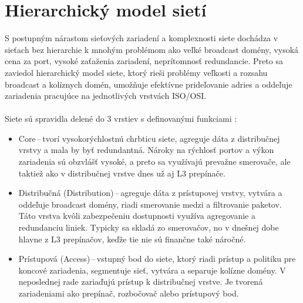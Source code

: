 \section{Hierarchický model sietí}
S postupným nárastom sieťových zariadení a komplexnosti siete dochádza v sieťach bez hierarchie k mnohým problémom ako veľké broadcast domény, vysoká cena za port, vysoké zaťaženia zariadení, neprítomnosť redundancie. Preto sa zaviedol hierarchický model siete, ktorý rieši problémy veľkosti a rozsahu broadcast a kolíznych domén, umožňuje efektívne prideľovanie  adries a oddeľuje zariadenia pracujúce na jednotlivých vrstvách ISO/OSI.  
\\\\
\noindent
Siete sú spravidla delené do 3 vrstiev s definovanými funkciami \cite{Lammle2013}:
\begin{itemize}
	\item Core\,--\,tvorí vysokorýchlostnú chrbticu siete, agreguje dáta z distribučnej vrstvy a mala by byť redundantná. Nároky na rýchlosť portov a výkon zariadenia sú obzvlášť vysoké, a preto sa využívajú prevažne smerovače, ale taktiež ako v distribučnej vrstve dnes už aj L3 prepínače.
	\item Distribučná (Distribution)\,--\,agreguje dáta z prístupovej vrstvy, vytvára a oddeľuje broadcast domény, riadi smerovanie medzi  a  filtrovanie paketov. Táto vrstva kvôli zabezpečeniu dostupnosti využíva agregovanie  a redundanciu liniek. Typicky sa skladá zo smerovačov, no v dnešnej dobe hlavne z L3 prepínačov, keďže tie nie sú finančne také náročné. 
	\item Prístupová (Access)\,--\,vstupný bod do siete, ktorý riadi prístup a politiku pre koncové zariadenia, segmentuje sieť, vytvára a separuje kolízne domény. V neposlednej rade zariaďujú prístup k distribučnej vrstve. Je tvorená zariadeniami ako prepínač, rozbočovač alebo prístupový bod.
\end{itemize} 

